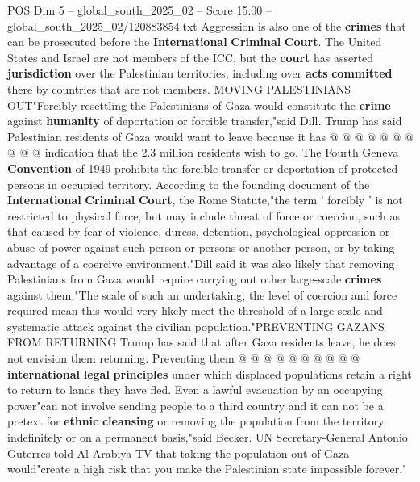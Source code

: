 \begin{textsample}{POS Dim 5 – global\_south\_2025\_02 – Score 15.00 – global\_south\_2025\_02/120883854.txt}
Aggression is also one of the \textbf{crimes} that can be prosecuted before the \textbf{International} \textbf{Criminal} \textbf{Court}.
The United States and Israel are not members of the ICC, but the \textbf{court} has asserted \textbf{jurisdiction} over the Palestinian territories, including over \textbf{acts} \textbf{committed} there by countries that are not members.
MOVING PALESTINIANS OUT"Forcibly resettling the Palestinians of Gaza would constitute the \textbf{crime} against \textbf{humanity} of deportation or forcible transfer,"said Dill.
Trump has said Palestinian residents of Gaza would want to leave because it has @ @ @ @ @ @ @ @ @ @ indication that the 2.3 million residents wish to go.
The Fourth Geneva \textbf{Convention} of 1949 prohibits the forcible transfer or deportation of protected persons in occupied territory.
According to the founding document of the \textbf{International} \textbf{Criminal} \textbf{Court}, the Rome Statute,"the term ' forcibly ' is not restricted to physical force, but may include threat of force or coercion, such as that caused by fear of violence, duress, detention, psychological oppression or abuse of power against such person or persons or another person, or by taking advantage of a coercive environment."Dill said it was also likely that removing Palestinians from Gaza would require carrying out other large-scale \textbf{crimes} against them."The scale of such an undertaking, the level of coercion and force required mean this would very likely meet the threshold of a large scale and systematic attack against the civilian population."PREVENTING GAZANS FROM RETURNING Trump has said that after Gaza residents leave, he does not envision them returning.
Preventing them @ @ @ @ @ @ @ @ @ @ \textbf{international} \textbf{legal} \textbf{principles} under which displaced populations retain a right to return to lands they have fled.
Even a lawful evacuation by an occupying power"can not involve sending people to a third country and it can not be a pretext for \textbf{ethnic} \textbf{cleansing} or removing the population from the territory indefinitely or on a permanent basis,"said Becker.
UN Secretary-General Antonio Guterres told Al Arabiya TV that taking the population out of Gaza would"create a high risk that you make the Palestinian state impossible forever."

\end{textsample}

